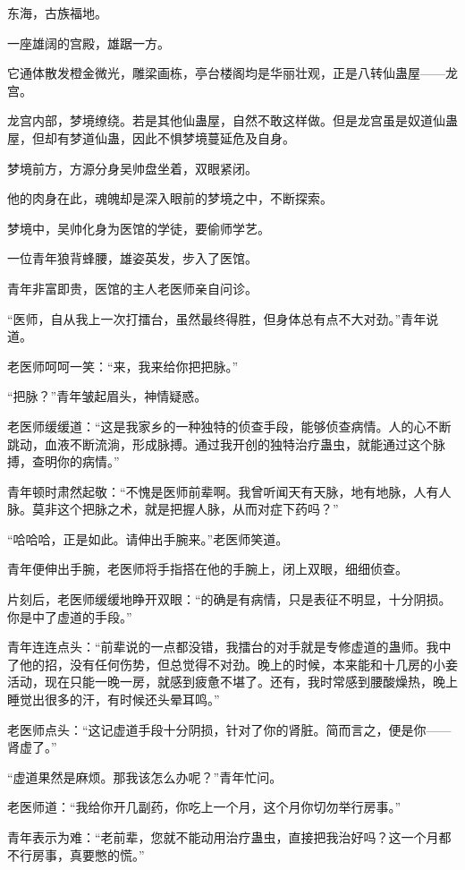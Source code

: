 
\begin{this_body}

东海，古族福地。

一座雄阔的宫殿，雄踞一方。

它通体散发橙金微光，雕梁画栋，亭台楼阁均是华丽壮观，正是八转仙蛊屋——龙宫。

龙宫内部，梦境缭绕。若是其他仙蛊屋，自然不敢这样做。但是龙宫虽是奴道仙蛊屋，但却有梦道仙蛊，因此不惧梦境蔓延危及自身。

梦境前方，方源分身吴帅盘坐着，双眼紧闭。

他的肉身在此，魂魄却是深入眼前的梦境之中，不断探索。

梦境中，吴帅化身为医馆的学徒，要偷师学艺。

一位青年狼背蜂腰，雄姿英发，步入了医馆。

青年非富即贵，医馆的主人老医师亲自问诊。

“医师，自从我上一次打擂台，虽然最终得胜，但身体总有点不大对劲。”青年说道。

老医师呵呵一笑：“来，我来给你把把脉。”

“把脉？”青年皱起眉头，神情疑惑。

老医师缓缓道：“这是我家乡的一种独特的侦查手段，能够侦查病情。人的心不断跳动，血液不断流淌，形成脉搏。通过我开创的独特治疗蛊虫，就能通过这个脉搏，查明你的病情。”

青年顿时肃然起敬：“不愧是医师前辈啊。我曾听闻天有天脉，地有地脉，人有人脉。莫非这个把脉之术，就是把握人脉，从而对症下药吗？”

“哈哈哈，正是如此。请伸出手腕来。”老医师笑道。

青年便伸出手腕，老医师将手指搭在他的手腕上，闭上双眼，细细侦查。

片刻后，老医师缓缓地睁开双眼：“的确是有病情，只是表征不明显，十分阴损。你是中了虚道的手段。”

青年连连点头：“前辈说的一点都没错，我擂台的对手就是专修虚道的蛊师。我中了他的招，没有任何伤势，但总觉得不对劲。晚上的时候，本来能和十几房的小妾活动，现在只能一晚一房，就感到疲惫不堪了。还有，我时常感到腰酸燥热，晚上睡觉出很多的汗，有时候还头晕耳鸣。”

老医师点头：“这记虚道手段十分阴损，针对了你的肾脏。简而言之，便是你——肾虚了。”

“虚道果然是麻烦。那我该怎么办呢？”青年忙问。

老医师道：“我给你开几副药，你吃上一个月，这个月你切勿举行房事。”

青年表示为难：“老前辈，您就不能动用治疗蛊虫，直接把我治好吗？这一个月都不行房事，真要憋的慌。”


\end{this_body}
